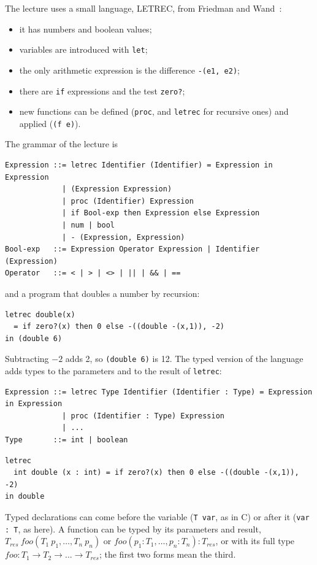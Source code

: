The lecture uses a small language, LETREC, from Friedman and
Wand~\cite[Ch.~4]{friedman2008essentials}:
\begin{itemize}
  \item it has numbers and boolean values;
  \item variables are introduced with \texttt{let};
  \item the only arithmetic expression is the difference \texttt{-(e1, e2)};
  \item there are \texttt{if} expressions and the test \texttt{zero?};
  \item new functions can be defined (\texttt{proc}, and \texttt{letrec} for
    recursive ones) and applied (\texttt{(f e)}).
\end{itemize}
The grammar of the lecture is
\begin{lstlisting}
Expression ::= letrec Identifier (Identifier) = Expression in Expression
             | (Expression Expression)
             | proc (Identifier) Expression
             | if Bool-exp then Expression else Expression
             | num | bool
             | - (Expression, Expression)
Bool-exp   ::= Expression Operator Expression | Identifier (Expression)
Operator   ::= < | > | <> | || | && | ==
\end{lstlisting}
and a program that doubles a number by recursion:
\begin{lstlisting}
letrec double(x)
  = if zero?(x) then 0 else -((double -(x,1)), -2)
in (double 6)
\end{lstlisting}
Subtracting $-2$ adds 2, so \texttt{(double 6)} is 12. The typed version of the
language adds types to the parameters and to the result of \texttt{letrec}:
\begin{lstlisting}
Expression ::= letrec Type Identifier (Identifier : Type) = Expression in Expression
             | proc (Identifier : Type) Expression
             | ...
Type       ::= int | boolean
\end{lstlisting}
\begin{lstlisting}
letrec
  int double (x : int) = if zero?(x) then 0 else -((double -(x,1)), -2)
in double
\end{lstlisting}
Typed declarations can come before the variable (\texttt{T var}, as in C) or
after it (\texttt{var : T}, as here). A function can be typed by its
parameters and result, $T_{\mathit{res}}\ \mathit{foo}(T_1\ p_1, \dots, T_n\ p_n)$
or $\mathit{foo}(p_1 : T_1, \dots, p_n : T_n) : T_{\mathit{res}}$, or with its full type
$\mathit{foo} : T_1 \to T_2 \to \dots \to T_{\mathit{res}}$; the first two forms mean the
third.

